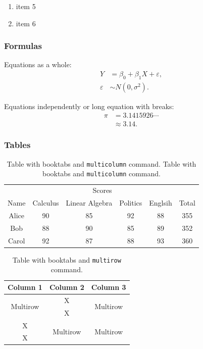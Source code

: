 \documentclass[English]{APSart}
\begin{document}
\begin{enumerate}[leftmargin=7.8mm,itemsep=-0.1ex,label=(\Roman*)]
	\item item 5
	\item item 6
\end{enumerate}

\subsubsection{Formulas}
Equations as a whole:
\begin{equation} \label{eq:1}
	\begin{aligned}
		Y & = \beta_0 + \beta_1 X + \varepsilon, \\
		\varepsilon & \sim N(0, \sigma^2). 
	\end{aligned}
\end{equation}

Equations independently or long equation with breaks:
\begin{align}
	\pi &= 3.1415926\cdots \nonumber \\
		&\approx  3.14.  \label{align-a1}
\end{align}

\subsubsection{Tables}
\begin{table}[htbp]
	\centering{}
	\caption{Table with booktabs and \texttt{multicolumn} command. Table with booktabs and \texttt{multicolumn} command. }\label{table:1}
	\vskip -5pt
	\begin{tabular}{cccccc}
		\toprule
		& \multicolumn{4}{c}{Scores} & \\
		\cmidrule(lr){2-5}
		Name & Calculus & Linear Algebra & Politics & Englsih & Total \\
		\midrule
		Alice & 90 & 85 & 92 & 88 & 355 \\
		Bob & 88 & 90 & 85 & 89 & 352 \\
		Carol & 92 & 87 & 88 & 93 & 360 \\
		\bottomrule
	\end{tabular}
\end{table}

\begin{table}[htbp]
	\centering{}
	\caption{Table with booktabs and \texttt{multirow} command.} 
	\vskip -5pt
	\begin{tabular}{ccc}
		\toprule
		Column 1 & Column 2 & Column 3\\ 
		\midrule
		\multirow{2}{*}{Multirow}&X&\multirow{2}{*}{Multirow}\\
		&X&\\
		X&\multirow{2}{*}{Multirow}&\multirow{2}{*}{Multirow}\\
		X&&\\
		\bottomrule
	\end{tabular}
\end{table}
\end{document}
